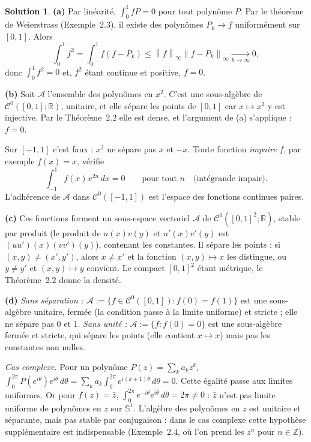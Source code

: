 \documentclass[11pt,a4paper]{article}
\newcommand{\R}{\mathbb{R}}
\newcommand{\Z}{\mathbb{Z}}
\newcommand{\Sun}{\mathbb{S}^1}
\newcommand{\norm}[1]{\left\|#1\right\|}
\newcommand{\Cz}{\mathcal{C}^0}
\theoremstyle{definition}
\newtheorem*{solution}{Solution}
\begin{document}
\begin{solution}
\noindent\textbf{(a)} Par linéarité, $\int_0^1fP=0$ pour tout polynôme $P$. Par le théorème de Weierstrass (Exemple~2.3), il existe des polynômes $P_k\to f$ uniformément sur $[0,1]$. Alors
\[
\int_0^1f^2=\int_0^1f(f-P_k)\le\norm f_\infty\norm{f-P_k}_\infty\xrightarrow[k\to\infty]{}0 ,
\]
donc $\int_0^1f^2=0$ et, $f^2$ étant continue et positive, $f=0$.

\medskip
\noindent\textbf{(b)} Soit $\mathcal A$ l'ensemble des polynômes en $x^2$. C'est une sous-algèbre de $\Cz([0,1];\R)$, unitaire, et elle sépare les points de $[0,1]$ car $x\mapsto x^2$ y est injective. Par le Théorème~2.2 elle est dense, et l'argument de (a) s'applique : $f=0$.

Sur $[-1,1]$ c'est faux : $x^2$ ne sépare pas $x$ et $-x$. Toute fonction \emph{impaire} $f$, par exemple $f(x)=x$, vérifie
\[
\int_{-1}^1f(x)x^{2n}\,dx=0\qquad\text{pour tout }n\quad\text{(intégrande impair).}
\] L'adhérence de $\mathcal A$ dans $\Cz([-1,1])$ est l'espace des fonctions continues paires.

\medskip
\noindent\textbf{(c)} Ces fonctions forment un sous-espace vectoriel $\mathcal A$ de $\Cz([0,1]^2;\R)$, stable par produit (le produit de $u(x)v(y)$ et $u'(x)v'(y)$ est $(uu')(x)(vv')(y)$), contenant les constantes. Il sépare les points : si $(x,y)\ne(x',y')$, alors $x\ne x'$ et la fonction $(x,y)\mapsto x$ les distingue, ou $y\ne y'$ et $(x,y)\mapsto y$ convient. Le compact $[0,1]^2$ étant métrique, le Théorème~2.2 donne la densité.

\medskip
\noindent\textbf{(d)} \emph{Sans séparation :} $\mathcal A:=\{f\in\Cz([0,1]):f(0)=f(1)\}$ est une sous-algèbre unitaire, fermée (la condition passe à la limite uniforme) et stricte ; elle ne sépare pas $0$ et $1$. \emph{Sans unité :} $\mathcal A:=\{f:f(0)=0\}$ est une sous-algèbre fermée et stricte, qui sépare les points (elle contient $x\mapsto x$) mais pas les constantes non nulles.

\emph{Cas complexe.} Pour un polynôme $P(z)=\sum_ka_kz^k$, $\int_0^{2\pi}P(e^{i\theta})e^{i\theta}\,d\theta=\sum_ka_k\int_0^{2\pi}e^{i(k+1)\theta}\,d\theta=0$. Cette égalité passe aux limites uniformes. Or pour $f(z)=\bar z$, $\int_0^{2\pi}e^{-i\theta}e^{i\theta}\,d\theta=2\pi\ne0$ : $\bar z$ n'est pas limite uniforme de polynômes en $z$ sur $\Sun$. L'algèbre des polynômes en $z$ est unitaire et séparante, mais pas stable par conjugaison : dans le cas complexe cette hypothèse supplémentaire est indispensable (Exemple~2.4, où l'on prend les $z^n$ pour $n\in\Z$).
\end{solution}
\end{document}
